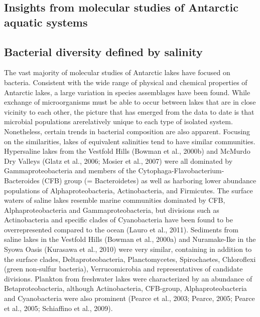 \documentclass{book}
\begin{document}
\subsection{Insights from molecular studies of Antarctic aquatic systems}

\subsection{Bacterial diversity defined by salinity}
The vast majority of molecular studies of Antarctic lakes have focused on bacteria.
Consistent with the wide range of physical and chemical properties of Antarctic lakes, a large variation in species assemblages have been found.
While exchange of microorganisms must be able to occur between lakes that are in close vicinity to each other, the picture that has emerged from the data to date is that microbial populations arerelatively unique to each type of isolated system. 
Nonetheless, certain trends in bacterial composition are also apparent.
Focusing on the similarities, lakes of equivalent salinities tend to have similar communities.
Hypersaline lakes from the Vestfold Hills (Bowman et al., 2000b) and McMurdo Dry Valleys (Glatz et al., 2006; Mosier et al., 2007) were all dominated by Gammaproteobacteria and members of the Cytophaga-Flavobacterium-Bacteroides (CFB) group (= Bacteroidetes) as well as harboring lower abundance populations of Alphaproteobacteria, Actinobacteria, and Firmicutes.
The surface waters of saline lakes resemble marine communities dominated by CFB, Alphaproteobacteria and Gammaproteobacteria, but divisions such as Actinobacteria and specific clades of Cyanobacteria have been found to be overrepresented compared to the ocean (Lauro et al., 2011).
Sediments from saline lakes in the Vestfold Hills (Bowman et al., 2000a) and Nuramake-Ike in the Syowa Oasis (Kurasawa et al., 2010) were very similar, containing in addition to the surface clades, Deltaproteobacteria, Planctomycetes, Spirochaetes, Chloroflexi (green non-sulfur bacteria), Verrucomicrobia and representatives of candidate divisions.
Plankton from freshwater lakes were characterized by an abundance of Betaproteobacteria, although Actinobacteria, CFB-group, Alphaproteobacteria and Cyanobacteria were also prominent (Pearce et al., 2003; Pearce, 2005; Pearce et al., 2005; Schiaffino et al., 2009). 
\end{document}
